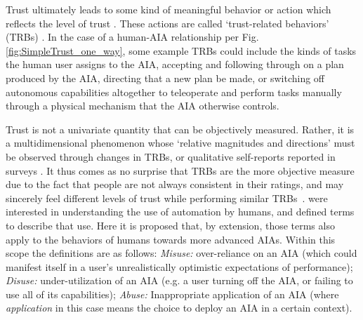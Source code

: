 
Trust ultimately leads to some kind of meaningful behavior or action which reflects the level of trust \cite{Lewis1985-pr}. 
These actions are called `trust-related behaviors' (TRBs) \cite{McKnight2001-fa}. %
In the case of a human-AIA relationship per Fig. \ref{fig:SimpleTrust_one_way}, %
some example TRBs could include the kinds of tasks the human user assigns to the AIA, accepting and following through on a plan produced by the AIA, directing that a new plan be made, or switching off autonomous capabilities altogether to teleoperate and perform tasks manually through a physical mechanism that the AIA otherwise controls.  %

    
    Trust is not a univariate quantity that can be objectively measured. Rather, it is a multidimensional phenomenon whose `relative magnitudes and directions' must be observed through changes in TRBs, or qualitative self-reports reported in surveys \cite{Muir1996-gt}. It thus comes as no surprise that TRBs are the more objective measure due to the fact that people are not always consistent in their ratings, and may sincerely feel different levels of trust while performing similar TRBs~\cite{Dzindolet2003-ts}. \citet{Parasuraman1997-co} were interested in understanding the use of automation by humans, and defined terms to describe that use. Here it is proposed that, by extension, those terms also apply to the behaviors of humans towards more advanced AIAs. Within this scope the definitions are as follows: \textit{Misuse:} over-reliance on an AIA (which could manifest itself in a user's unrealistically optimistic expectations of performance); \textit{Disuse:} under-utilization of an AIA (e.g. a user turning off the AIA, or failing to use all of its capabilities); \textit{Abuse:} Inappropriate application of an AIA (where \emph{application} in this case means the choice to deploy an AIA in a certain context).

